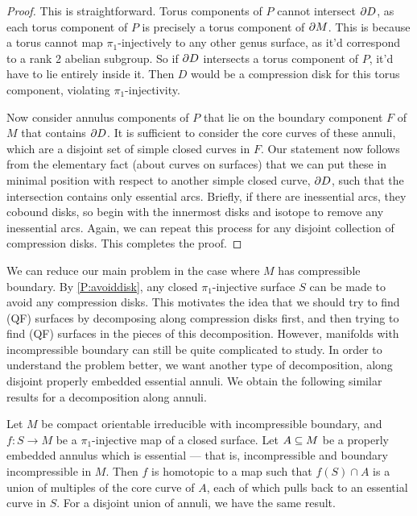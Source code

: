 \begin{proof}

This is straightforward. Torus components of $P$ cannot intersect $\partial D$, as
each torus component of $P$ is precisely a torus component of $\partial M$. This is
because a torus cannot map $\pi_1$-injectively to any other genus surface, as
it'd correspond to a rank 2 abelian subgroup. So if $\partial D$ intersects a torus
component of $P$, it'd have to lie entirely inside it. Then $D$ would be
a compression disk for this torus component, violating $\pi_1$-injectivity.

Now consider annulus components of $P$ that lie on the boundary component $F$
of $M$ that contains $\partial D$. It is sufficient to consider the core curves of
these annuli, which are a disjoint set of simple closed curves in $F$. Our
statement now follows from the elementary fact (about curves on surfaces) that
we can put these in minimal position with respect to another simple closed
curve, $\partial D$, such that the intersection contains only essential arcs.
Briefly, if there are inessential arcs, they cobound disks, so begin with the
innermost disks and isotope to remove any inessential arcs. Again, we can
repeat this process for any disjoint collection of compression disks. This
completes the proof.

\end{proof}

We can reduce our main problem in the case where $M$ has compressible boundary.
By \ref{P:avoiddisk}, any closed $\pi_1$-injective surface $S$ can be made to
avoid any compression disks. This motivates the idea that we should try to find
(QF) surfaces by decomposing along compression disks first, and then trying to
find (QF) surfaces in the pieces of this decomposition. However, manifolds with
incompressible boundary can still be quite complicated to study. In order to
understand the problem better, we want another type of decomposition, along
disjoint properly embedded essential annuli. We obtain the following similar
results for a decomposition along annuli.

\begin{prop}

Let $M$ be compact orientable irreducible with incompressible boundary, and $f
\colon S \to M$ be a $\pi_1$-injective map of a closed surface. Let $A \subseteq M$
be a properly embedded annulus which is essential --- that is, incompressible
and boundary incompressible in $M$. Then $f$ is homotopic to a map such that
$f(S) \cap A$ is a union of multiples of the core curve of $A$, each of which
pulls back to an essential curve in $S$.  For a disjoint union of annuli, we
have the same result.

\end{prop}

